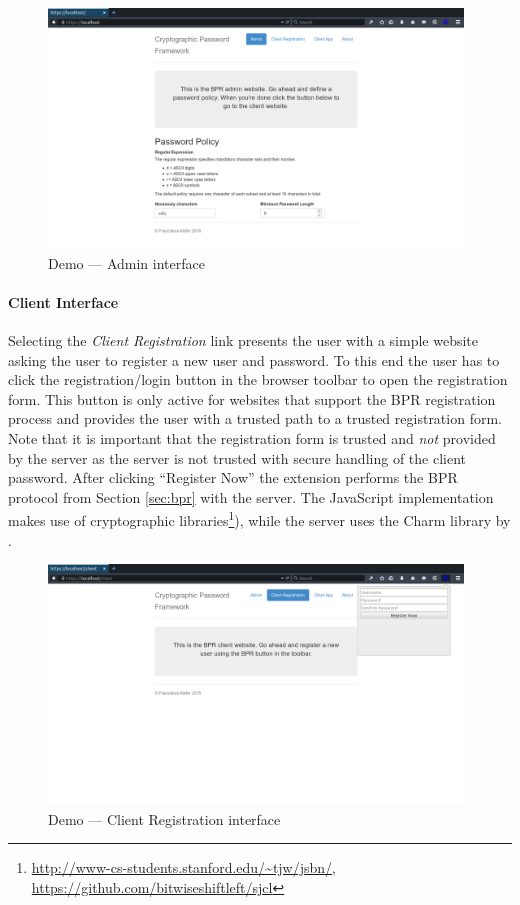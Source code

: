 \begin{figure}[tbph]
\centering
\includegraphics[width=0.98\textwidth]{Figs/demo-admin.png}
\caption{Demo --- Admin interface}\label{fig:demo-admin}
\end{figure}

\paragraph{Client Interface}
Selecting the \emph{Client Registration} link presents the user with a simple website asking the user to register a new user and password.
To this end the user has to click the registration/login button in the browser toolbar to open the registration form.
This button is only active for websites that support the \ac{BPR} registration process and provides the user with a trusted path to a trusted registration form.
Note that it is important that the registration form is trusted and \emph{not} provided by the server as the server is not trusted with secure handling of the client password.
After clicking ``Register Now'' the extension performs the \ac{BPR} protocol from Section \ref{sec:bpr} with the server.
The JavaScript implementation makes use of cryptographic libraries\footnote{\url{http://www-cs-students.stanford.edu/~tjw/jsbn/}, \url{https://github.com/bitwiseshiftleft/sjcl}}), while the server uses the Charm library by \citet{charm13}.

\begin{figure}[tbph]
\centering
\includegraphics[width=0.98\textwidth]{Figs/demo-register-popup.png}
\caption{Demo --- Client Registration interface}\label{fig:demo-register}
\end{figure}

